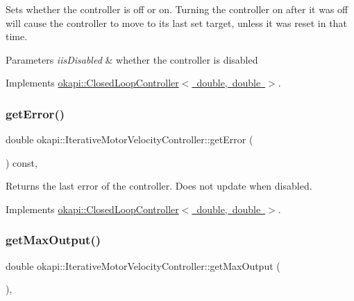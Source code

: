 Sets whether the controller is off or on. Turning the controller on after it was off will cause the controller to move to its last set target, unless it was reset in that time.


\begin{DoxyParams}{Parameters}
{\em iis\+Disabled} & whether the controller is disabled \\
\hline
\end{DoxyParams}


Implements \mbox{\hyperlink{classokapi_1_1ClosedLoopController_a768cd1db40ce9cd5c89b20be6e838ccc}{okapi\+::\+Closed\+Loop\+Controller$<$ double, double $>$}}.

\mbox{\label{classokapi_1_1IterativeMotorVelocityController_aee5e0bfdaa45c2748b9f4bf8b549f286}} 
\subsubsection{\texorpdfstring{getError()}{getError()}}
{\footnotesize\ttfamily double okapi\+::\+Iterative\+Motor\+Velocity\+Controller\+::get\+Error (\begin{DoxyParamCaption}{ }\end{DoxyParamCaption}) const\hspace{0.3cm}{\ttfamily [override]}, {\ttfamily [virtual]}}

Returns the last error of the controller. Does not update when disabled. 

Implements \mbox{\hyperlink{classokapi_1_1ClosedLoopController_a50c73444ff6e3e631951c43d0f951953}{okapi\+::\+Closed\+Loop\+Controller$<$ double, double $>$}}.

\mbox{\label{classokapi_1_1IterativeMotorVelocityController_a48d88a7c9cec2c7046d0f7f61d8777c9}} 
\subsubsection{\texorpdfstring{getMaxOutput()}{getMaxOutput()}}
{\footnotesize\ttfamily double okapi\+::\+Iterative\+Motor\+Velocity\+Controller\+::get\+Max\+Output (\begin{DoxyParamCaption}{ }\end{DoxyParamCaption})\hspace{0.3cm}{\ttfamily [override]}, {\ttfamily [virtual]}}

